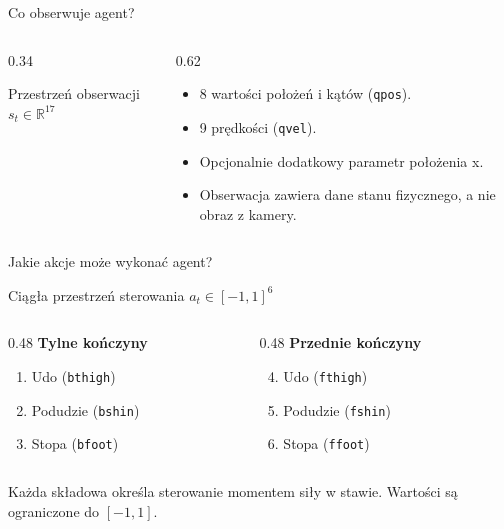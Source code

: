 \documentclass[aspectratio=169,11pt]{beamer}
\begin{document}
\begin{frame}{Co obserwuje agent?}
  \begin{columns}[T,onlytextwidth]
    \begin{column}{0.34\textwidth}
      \begin{block}{Przestrze\'n obserwacji}
        \centering $s_t\in\mathbb{R}^{17}$
      \end{block}
    \end{column}
    \begin{column}{0.62\textwidth}
        \begin{itemize}
        \item 8 warto\'sci po\l o\.ze\'n i k\k{a}t\'ow (\texttt{qpos}).
        \item 9 pr\k{e}dko\'sci (\texttt{qvel}).
        \item Opcjonalnie dodatkowy parametr położenia x.
        \item Obserwacja zawiera dane stanu fizycznego, a nie obraz z kamery.
      \end{itemize}
    \end{column}
  \end{columns}
\end{frame}

\begin{frame}{Jakie akcje mo\.ze wykona\'c agent?}
  \begin{block}{Ci\k{a}g\l a przestrze\'n sterowania}
    \centering $a_t\in[-1,1]^6$
  \end{block}
  \begin{columns}[T,onlytextwidth]
    \begin{column}{0.48\textwidth}
      \textbf{Tylne ko\'nczyny}
      \begin{enumerate}
        \item Udo (\texttt{bthigh})
        \item Podudzie (\texttt{bshin})
        \item Stopa (\texttt{bfoot})
      \end{enumerate}
    \end{column}
    \begin{column}{0.48\textwidth}
      \textbf{Przednie ko\'nczyny}
      \begin{enumerate}\setcounter{enumi}{3}
        \item Udo (\texttt{fthigh})
        \item Podudzie (\texttt{fshin})
        \item Stopa (\texttt{ffoot})
      \end{enumerate}
    \end{column}
  \end{columns}
  \vspace{0.4em}
  \small Ka\.zda sk\l adowa okre\'sla sterowanie momentem si\l y w stawie. Warto\'sci s\k{a} ograniczone do $[-1,1]$.
\end{frame}
\end{document}
